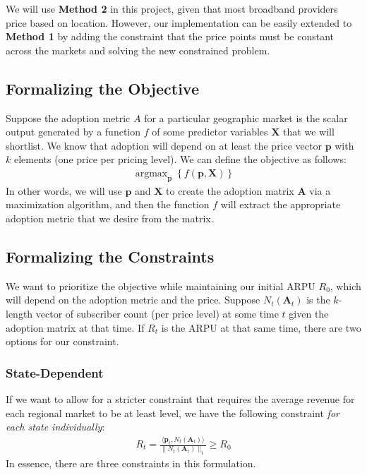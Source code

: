 \documentclass[11pt, titlepage]{report}
\DeclareMathOperator*{\argmax}{argmax}
\begin{document}
We will use \textbf{Method 2} in this project, given that most broadband providers price based on location. However, our implementation can be easily extended to \textbf{Method 1} by adding the constraint that the price points must be constant across the markets and solving the new constrained problem.

\subsection*{Formalizing the Objective}
Suppose the adoption metric $A$ for a particular geographic market is the scalar output generated by a function $f$ of some predictor variables $\mathbf{X}$ that we will shortlist. We know that adoption will depend on at least the price vector $\mathbf{p}$ with $k$ elements (one price per pricing level). We can define the objective as follows:
\begin{align*}
  \argmax_{\mathbf{p}} \left\{f(\mathbf{p}, \mathbf{X})\right\}
\end{align*}
In other words, we will use $\mathbf{p}$ and $\mathbf{X}$ to create the adoption matrix $\mathbf{A}$ via a maximization algorithm, and then the function $f$ will extract the appropriate adoption metric that we desire from the matrix.

\subsection*{Formalizing the Constraints}
We want to prioritize the objective while maintaining our initial ARPU $R_{0}$, which will depend on the adoption metric and the price. Suppose $N_t(\mathbf{A}_t)$ is the $k$-length vector of subscriber count (per price level) at some time $t$ given the adoption matrix at that time. If $R_t$ is the ARPU at that same time, there are two options for our constraint.

\subsubsection*{State-Dependent}
If we want to allow for a stricter constraint that requires the average revenue for each regional market to be at least level, we have the following constraint \textit{for each state individually}:
\begin{align*}
  R_{t} = \frac{\langle \mathbf{p}_t, N_t(\mathbf{A}_t) \rangle}{\|N_t(\mathbf{A}_t)\|_1} \geq R_{0}
\end{align*}
In essence, there are three constraints in this formulation.
\end{document}
